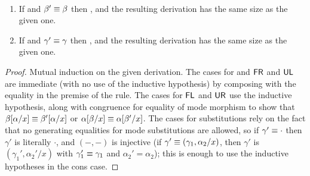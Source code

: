 {\begin{lemma} ~ \label{lemma:respecteq}
\begin{enumerate}
\item If  and $\beta' \equiv \beta$ then
, and the resulting derivation has the same size
as the given one.
\item If \seq{\Gamma}{\gamma}{\Delta} and $\gamma' \equiv \gamma$ then
  , and the resulting derivation has the
  same size as the given one.
\end{enumerate}
\end{lemma}
\begin{proof}
Mutual induction on the given derivation.  The cases for  and
$\mathsf{FR}$ and $\mathsf{UL}$ are immediate (with no use of the inductive
hypothesis) by composing with the equality in the premise of the rule.
The cases for $\mathsf{FL}$ and $\mathsf{UR}$ use the inductive hypothesis,
along with congruence for equality of mode morphism to show that
$\beta[\alpha/x] \equiv \beta'[\alpha/x]$ or
$\alpha[\beta/x] \equiv \alpha[\beta'/x]$.  The cases
for substitutions rely on the fact that no generating equalities for
mode substitutions are allowed, so if $\gamma' \equiv \cdot$ then
$\gamma'$ is literally $\cdot$, and $(-,-)$ is injective (if $\gamma'
\equiv (\gamma_1,\alpha_2/x)$, then $\gamma'$ is $(\gamma_1',\alpha_2'/x)$
with $\gamma_1' \equiv \gamma_1$ and $\alpha_2' = \alpha_2$); this is
enough to use the inductive hypotheses in the cons case.  
\end{proof}

}
